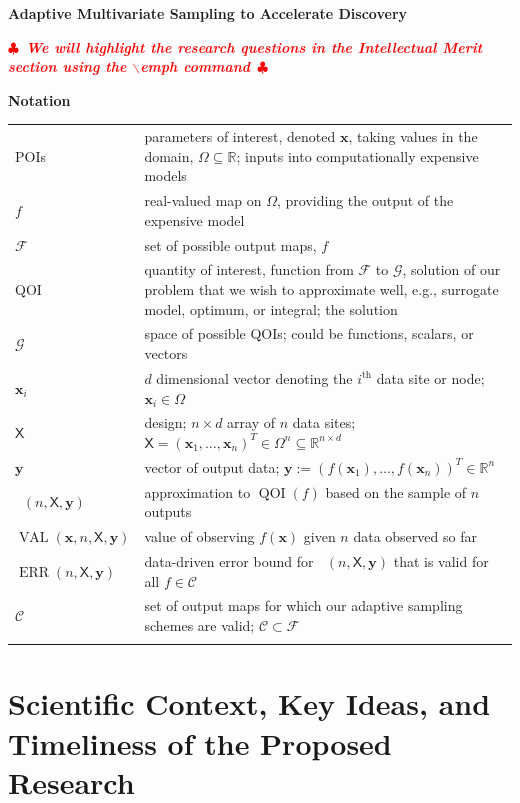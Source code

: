 \documentclass[11pt]{NSFamsart}
\DeclareMathOperator{\QOI}{QOI} %
\DeclareMathOperator{\APP}{\widehat{\QOI}}
\DeclareMathOperator{\ERR}{ERR}
\DeclareMathOperator{\VAL}{VAL}
\newcommand{\reals}{{\mathbb{R}}}
\newcommand{\mX}{\mathsf{X}}
\newcommand{\bx}{{\boldsymbol{x}}}
\newcommand{\by}{{\boldsymbol{y}}}
\newcommand{\calc}{{\mathcal{C}}}
\newcommand{\calf}{{\mathcal{F}}}
\newcommand{\calg}{{\mathcal{G}}}
\newif\ifnotesw \noteswtrue
\newcommand{\notes}[1]{\ifnotesw \textcolor{red}{  $\clubsuit$\ {\sf \bf \it  #1}\ $\clubsuit$  }\fi}
\begin{document}

\begin{center}
\Large \textbf{
Adaptive Multivariate Sampling to Accelerate  Discovery\\ 
}
\end{center}
\vspace{-2ex}

\setcounter{tocdepth}{3}
\tableofcontents

\vspace{-6ex}


\notes{We will highlight the research questions in the Intellectual Merit section using the $\backslash$emph command}

\noindent \textbf{Notation}

\begin{longtable}{>{\raggedleft}p{2.5cm}@{\quad}>{\raggedright}p{12.5cm}}
POIs & parameters of interest, denoted $\bx$, taking values in the domain, $\Omega \subseteq \reals$; inputs into computationally expensive models \tabularnewline
$f$ & real-valued map on $\Omega$, providing the output of the expensive model \tabularnewline
$\calf$ & set of possible output maps, $f$ \tabularnewline
QOI & quantity of interest, function from $\calf$ to $\calg$, solution of our problem that we wish to approximate well, e.g., surrogate model, optimum, or integral; the solution \tabularnewline
$\calg$ & space of possible QOIs; could be functions, scalars, or vectors\tabularnewline
$\bx_i$ & $d$ dimensional vector denoting the $i^{\text{th}}$ data site or node; $\bx_i \in \Omega$ \tabularnewline
$\mX$ & design;  $n \times d$ array of $n$ data sites; $\mX = (\bx_1, \ldots, \bx_n)^T \in \Omega^{n} \subseteq \reals^{n \times d}$ \tabularnewline
$\by$ & vector of output data; $\by := (f(\bx_1), \ldots, f(\bx_n))^T \in \reals^n$   \tabularnewline
$\APP(n,\mX,\by)$ & approximation to $\QOI(f)$ based on the sample of $n$ outputs\tabularnewline
$\VAL(\bx,n,\mX, \by)$ & value of observing $f(\bx)$ given $n$ data observed so far \tabularnewline
$\ERR(n,\mX,\by)$ & data-driven error bound for $\APP(n,\mX,\by)$ that is valid for all $f \in \calc$ \tabularnewline
$\calc$ & set of output maps for which our adaptive sampling schemes are valid; $\calc \subset \calf$ \tabularnewline
& \tabularnewline
\end{longtable}
\newpage
\section{Scientific Context, Key Ideas, and Timeliness of the Proposed Research}
\end{document}
